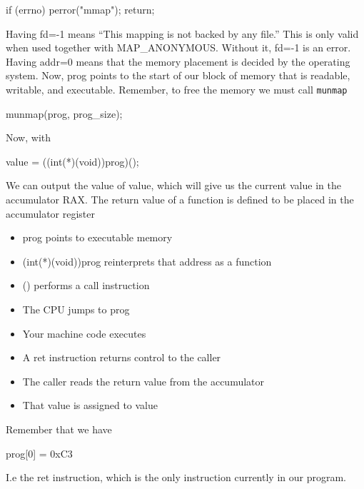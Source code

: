 \documentclass{report}
\begin{document}
\begin{itemize}
\begin{cppcode}
if (errno) {
    perror("mmap");
    return;
}
            \end{cppcode}
            \bigbreak \noindent 
            Having fd=-1 means “This mapping is not backed by any file.” This is only valid when used together with MAP\_ANONYMOUS. Without it, fd=-1 is an error.
            \bigbreak \noindent 
            Having addr=0 means that the memory placement is decided by the operating system.
            \bigbreak \noindent 
            Now, prog points to the start of our block of memory that is readable, writable, and executable. Remember, to free the memory we must call \texttt{munmap}
            \bigbreak \noindent 
            \begin{cppcode}
            munmap(prog, prog_size);
            \end{cppcode}
            \bigbreak \noindent 
            Now, with
            \bigbreak \noindent 
            \begin{cppcode}
                value = ((int(*)(void))prog)();
            \end{cppcode}
            \bigbreak \noindent 
            We can output the value of value, which will give us the current value in the accumulator RAX. The return value of a function is defined to be placed in the accumulator register
            \begin{itemize}
                \item prog points to executable memory
                \item (int(*)(void))prog reinterprets that address as a function
                \item () performs a call instruction
                \item The CPU jumps to prog
                \item Your machine code executes
                \item A ret instruction returns control to the caller
                \item The caller reads the return value from the accumulator
                \item That value is assigned to value
            \end{itemize}
            Remember that we have 
            \bigbreak \noindent 
            \begin{cppcode}
                prog[0] = 0xC3
            \end{cppcode}
            \bigbreak \noindent 
            I.e the ret instruction, which is the only instruction currently in our program.

\end{itemize}
\end{document}
